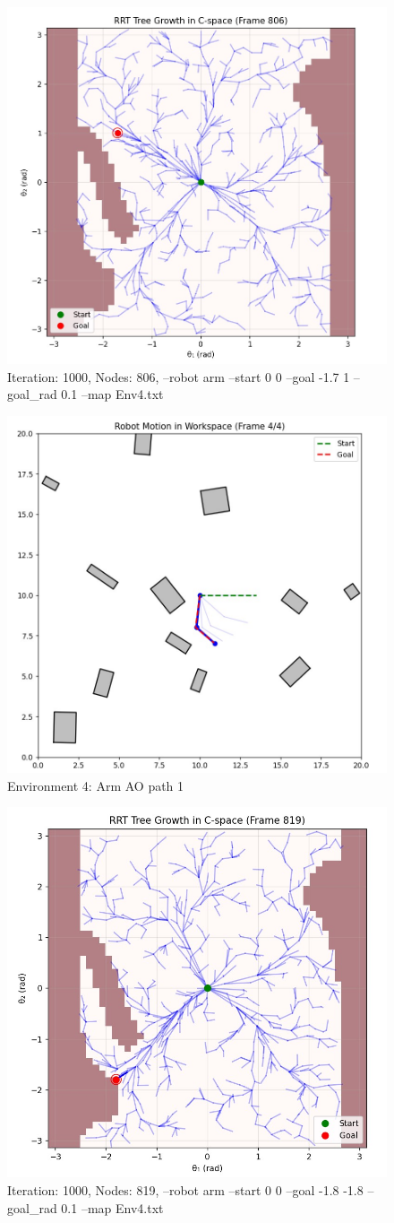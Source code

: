 \documentclass{article}
\begin{document}
\begin{figure} [H]
    \centering
    \includegraphics[width=0.5\linewidth]{latex_media/Env4AOTreeGrowthA1.jpg}
    \caption{Iteration: 1000, Nodes: 806, --robot arm --start 0 0 --goal -1.7 1 --goal\_rad 0.1 --map Env4.txt}
\end{figure}

\begin{figure} [H]
    \centering
    \includegraphics[width=0.5\linewidth]{latex_media/Env4AORobotPathA1.jpg}
    \caption{Environment 4: Arm AO path 1}
\end{figure}

\begin{figure} [H]
    \centering
    \includegraphics[width=0.5\linewidth]{latex_media/Env4AOTreeGrowthA2.jpg}
    \caption{Iteration: 1000, Nodes: 819, --robot arm --start 0 0 --goal -1.8 -1.8 --goal\_rad 0.1 --map Env4.txt}
\end{figure}
\end{document}
